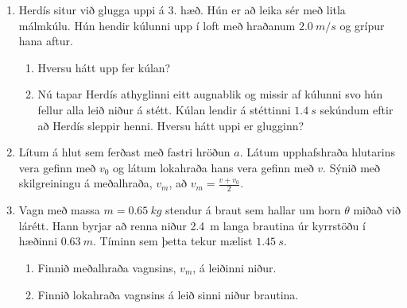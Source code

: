 \ifdefined \wholebook \else\documentclass[oneside]{book}\usepackage{EdlBook}\graphicspath{{figures/}}
\begin{document}
\begin{enumerate}[label = \textbf{Dæmi \thechapter.\arabic*.}]
\item Herdís situr við glugga uppi á $3.$ hæð. Hún er að leika sér með litla málmkúlu. Hún hendir kúlunni upp í loft með hraðanum $\SI{2.0}{m/s}$ og grípur hana aftur.
\begin{enumerate}[label = \textbf{(\alph*)}]
    \item Hversu hátt upp fer kúlan?
    \item Nú tapar Herdís athyglinni eitt augnablik og missir af kúlunni svo hún fellur alla leið niður á stétt. Kúlan lendir á stéttinni $\SI{1.4}{s}$ sekúndum eftir að Herdís sleppir henni. Hversu hátt uppi er glugginn?
\end{enumerate}

\item Lítum á hlut sem ferðast með fastri hröðun $a$. Látum upphafshraða hlutarins vera gefinn með $v_0$ og látum lokahraða hans vera gefinn með $v$. Sýnið með skilgreiningu á meðalhraða, $v_m$, að $v_m = \frac{v + v_0}{2}$.

\item Vagn með massa $m = \SI{0,65}{kg}$ stendur á braut sem hallar um horn $\theta$ miðað við lárétt. Hann byrjar að renna niður \SI{2,4}{m} langa brautina úr kyrrstöðu í hæðinni $\SI{0,63}{m}$. Tíminn sem þetta tekur mælist $\SI{1,45}{s}$.
    \begin{enumerate}[label = \textbf{(\alph*)}]
        \item Finnið meðalhraða vagnsins, $v_m$, á leiðinni niður.
        \item Finnið lokahraða vagnsins á leið sinni niður brautina.
    \end{enumerate}
    
\end{enumerate}

\newpage
\end{document}
